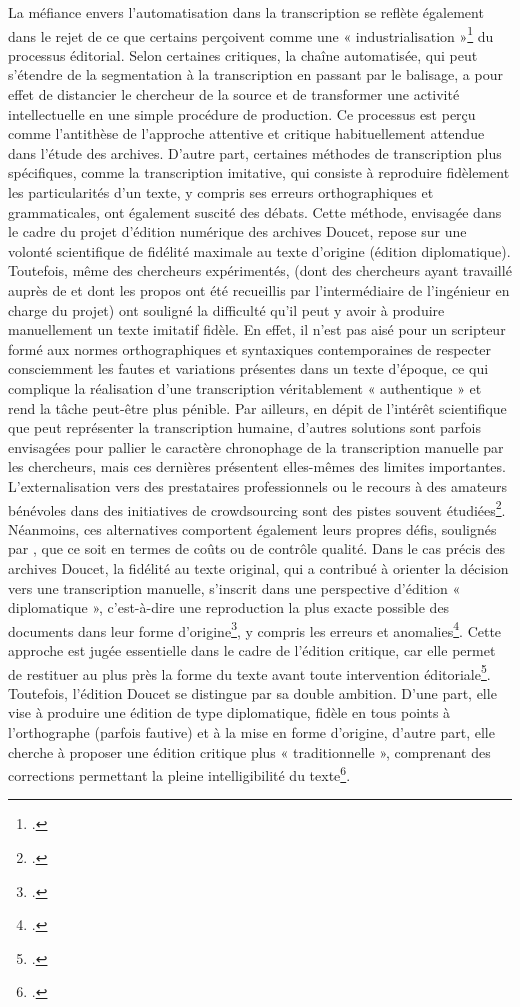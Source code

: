La méfiance envers l'automatisation dans la transcription se reflète également dans le rejet de ce que certains perçoivent comme une « industrialisation »\footcite[p.83]{chateau-dutier_editions_2021} du processus éditorial. Selon certaines critiques, la chaîne automatisée, qui peut s’étendre de la segmentation à la transcription en passant par le balisage, a pour effet de distancier le chercheur de la source et de transformer une activité intellectuelle en une simple procédure de production. Ce processus est perçu comme l'antithèse de l’approche attentive et critique habituellement attendue dans l’étude des archives.
D’autre part, certaines méthodes de transcription plus spécifiques, comme la transcription imitative, qui consiste à reproduire fidèlement les particularités d’un texte, y compris ses erreurs orthographiques et grammaticales, ont également suscité des débats. Cette méthode, envisagée dans le cadre du projet d'édition numérique des archives Doucet, repose sur une volonté scientifique de fidélité maximale au texte d’origine (édition diplomatique). Toutefois, même des chercheurs expérimentés, (dont des chercheurs ayant travaillé auprès de \pense et dont les propos ont été recueillis par l’intermédiaire de l’ingénieur en charge du projet) ont souligné la difficulté qu’il peut y avoir à produire manuellement un texte imitatif fidèle. En effet, il n'est pas aisé pour un scripteur formé aux normes orthographiques et syntaxiques contemporaines de respecter consciemment les fautes et variations présentes dans un texte d'époque, ce qui complique la réalisation d'une transcription véritablement « authentique » et rend la tâche peut-être plus pénible.
Par ailleurs, en dépit de l’intérêt scientifique que peut représenter la transcription humaine, d'autres solutions sont parfois envisagées pour pallier le caractère chronophage de la transcription manuelle par les chercheurs, mais ces dernières présentent elles-mêmes des limites importantes. L’externalisation vers des prestataires professionnels ou le recours à des amateurs bénévoles dans des initiatives de crowdsourcing sont des pistes souvent étudiées\footcite{chague_intelligence_2022}. Néanmoins, ces alternatives comportent également leurs propres défis, soulignés par \citeauthor{chague_intelligence_2022}, que ce soit en termes de coûts ou de contrôle qualité.
Dans le cas précis des archives Doucet, la fidélité au texte original, qui a contribué à orienter la décision vers une transcription manuelle, s’inscrit dans une perspective d’édition « diplomatique », c’est-à-dire une reproduction la plus exacte possible des documents dans leur forme d’origine\footcite{masai_principes_1950}, y compris les erreurs et anomalies\footcite{gvelesiani_quest-ce_2017}. Cette approche est jugée essentielle dans le cadre de l’édition critique, car elle permet de restituer au plus près la forme du texte avant toute intervention éditoriale\footcite[p.18]{duval_pour_2017}. Toutefois, l’édition Doucet se distingue par sa double ambition. D’une part, elle vise à produire une édition de type diplomatique, fidèle en tous points à l’orthographe (parfois fautive) et à la mise en forme d’origine, d’autre part, elle cherche à proposer une édition critique plus « traditionnelle », comprenant des corrections permettant la pleine intelligibilité du texte\footcite{carius_principes_2024}.

